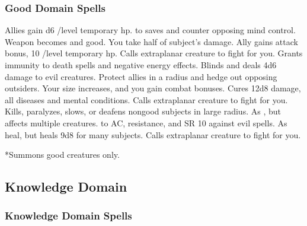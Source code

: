 \subsubsection{Good Domain Spells}
\begin{spelllist}
 Allies gain d6 /level temporary hp.
  to saves and counter opposing mind control.
 Weapon becomes  and good.
\F You take half of subject's damage.
 Ally gains  attack bonus, 10 /level temporary hp.
 Calls extraplanar creature to fight for you.
 Grants immunity to death spells and negative energy effects.
 Blinds and deals 4d6 damage to evil creatures.
 Protect allies in a \areamed radius and hedge out opposing outsiders.
 Your size increases, and you gain combat bonuses.
 Cures 12d8 damage, all diseases and mental conditions.
 Calls extraplanar creature to fight for you.
\F Kills, paralyzes, slows, or deafens nongood subjects in large radius.
\spellhead[7]{}
 As , but affects multiple creatures.
  to AC,  resistance, and SR 10 against evil spells.
 As heal, but heals 9d8 for many subjects.
 Calls extraplanar creature to fight for you.
\end{spelllist}
*Summons good creatures only.

\subsection{Knowledge Domain}
\subsubsection{Knowledge Domain Spells}
\begin{spelllist}
\spellhead[1]{}
\spellhead[2]{}
\spellhead[8]{}
\end{spelllist}

